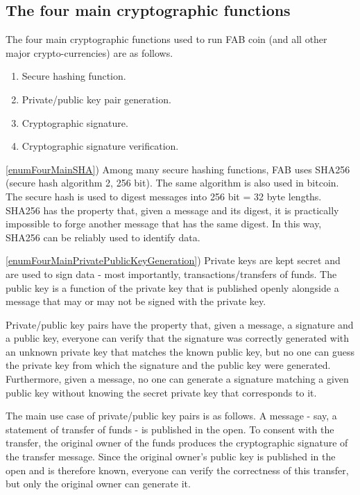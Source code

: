 \documentclass{article}
\begin{document}
\subsection{The four main cryptographic functions} \label{sectionFourMainCrypto}
The four main cryptographic functions used to run FAB coin (and all other major crypto-currencies) are as follows.
\begin{enumerate}
\item \label{enumFourMainSHA} Secure hashing function.
\item \label{enumFourMainPrivatePublicKeyGeneration} Private/public key pair generation.
\item \label{enumFourMainCryptoSignature} Cryptographic signature.
\item \label{enumFourMainVerification} Cryptographic signature verification.
\end{enumerate}

\noindent\ref{enumFourMainSHA}) Among many secure hashing functions, FAB uses SHA256 (secure hash algorithm 2, 256 bit). The same algorithm is also used in bitcoin. The secure hash is used to digest messages into 256 bit = 32 byte lengths. SHA256 has the property that, given a message and its digest, it is practically impossible to forge another message that has the same digest. 
In this way, SHA256 can be reliably used to identify data. 

\noindent\ref{enumFourMainPrivatePublicKeyGeneration}) Private keys are kept secret and are used to sign data - most importantly, transactions/transfers of funds. The public key is a function of the private key that is published openly alongside a message that may or may not be signed with the private key. 

Private/public key pairs have the property that, given a message, a signature and a public key, everyone can verify that the signature was correctly generated with an unknown private key that matches the known public key, but no one can guess the private key from which the signature and the public key were generated. Furthermore, given a message, no one can generate a signature matching a given public key without knowing the secret private key that corresponds to it.

The main use case of private/public key pairs is as follows. A message - say, a statement of transfer of funds - is published in the open. To consent with the transfer, the original owner of the funds produces the cryptographic signature of the transfer message. Since the original owner's public key is published in the open and is therefore known, everyone can verify the correctness of this transfer, but only the original owner can generate it.
\end{document}
